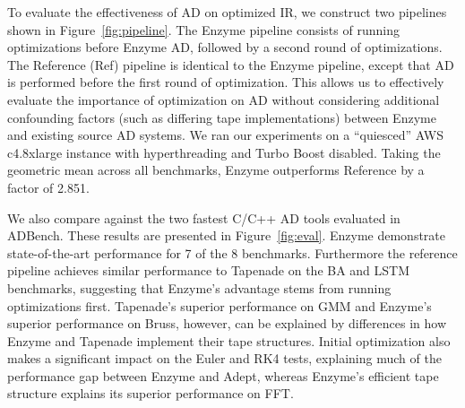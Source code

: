 To evaluate the effectiveness of AD on optimized IR, we construct two pipelines shown in Figure~\ref{fig:pipeline}. The Enzyme pipeline consists of running optimizations before Enzyme AD, followed by a second round of optimizations. The Reference (Ref) pipeline is identical to the Enzyme pipeline, except that AD is performed before the first round of optimization. This allows us to effectively evaluate the importance of optimization on AD without considering additional confounding factors (such as differing tape implementations) between Enzyme and existing source AD systems. We ran our experiments on a ``quiesced'' AWS c4.8xlarge instance with hyperthreading and Turbo Boost disabled. Taking the geometric mean across all benchmarks, Enzyme outperforms Reference by a factor of 2.851.

We also compare against the two fastest C/C++ AD tools evaluated in ADBench. These results are presented in Figure~\ref{fig:eval}. Enzyme demonstrate state-of-the-art performance for 7 of the 8 benchmarks. Furthermore the reference pipeline achieves similar performance to Tapenade on the BA and LSTM benchmarks, suggesting that Enzyme's advantage stems from running optimizations first. Tapenade's superior performance on GMM and Enzyme's superior performance on Bruss, however, can be explained by differences in how Enzyme and Tapenade implement their tape structures. Initial optimization also makes a significant impact on the Euler and RK4 tests, explaining much of the performance gap between Enzyme and Adept, whereas Enzyme's efficient tape structure explains its superior performance on FFT.


